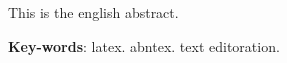 \begin{resumo}[Abstract]
   This is the english abstract.

   \vspace{\onelineskip}

   \noindent
   \textbf{Key-words}: latex. abntex. text editoration.
\end{resumo}
